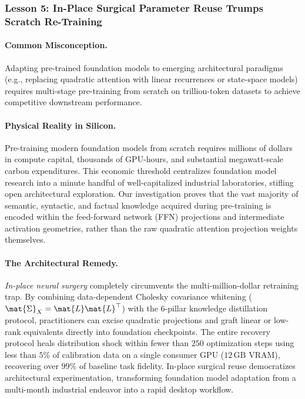 \subsubsection{Lesson 5: In-Place Surgical Parameter Reuse Trumps Scratch Re-Training}
\label{subsubsec:lesson5}

\paragraph{Common Misconception.}
Adapting pre-trained foundation models to emerging architectural paradigms (e.g., replacing quadratic attention with linear recurrences or state-space models) requires multi-stage pre-training from scratch on trillion-token datasets to achieve competitive downstream performance.

\paragraph{Physical Reality in Silicon.}
Pre-training modern foundation models from scratch requires millions of dollars in compute capital, thousands of GPU-hours, and substantial megawatt-scale carbon expenditures.
This economic threshold centralizes foundation model research into a minute handful of well-capitalized industrial laboratories, stifling open architectural exploration.
Our investigation proves that the vast majority of semantic, syntactic, and factual knowledge acquired during pre-training is encoded within the feed-forward network (FFN) projections and intermediate activation geometries, rather than the raw quadratic attention projection weights themselves.

\paragraph{The Architectural Remedy.}
\emph{In-place neural surgery} completely circumvents the multi-million-dollar retraining trap.
By combining data-dependent Cholesky covariance whitening ($\mat{\Sigma}_X = \mat{L}\mat{L}^\top$) with the 6-pillar knowledge distillation protocol, practitioners can excise quadratic projections and graft linear or low-rank equivalents directly into foundation checkpoints.
The entire recovery protocol heals distribution shock within fewer than $250$ optimization steps using less than $5\%$ of calibration data on a single consumer GPU ($12\,\text{GB}$ VRAM), recovering over $99\%$ of baseline task fidelity.
In-place surgical reuse democratizes architectural experimentation, transforming foundation model adaptation from a multi-month industrial endeavor into a rapid desktop workflow.

